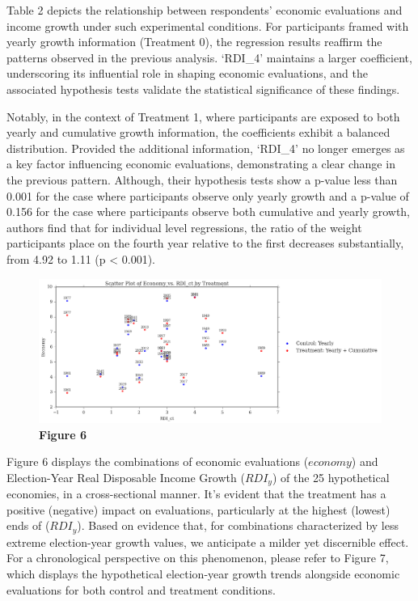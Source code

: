 \documentclass[
]{article}
\begin{document}
Table 2 depicts the relationship between respondents' economic
evaluations and income growth under such experimental conditions. For
participants framed with yearly growth information (Treatment 0), the
regression results reaffirm the patterns observed in the previous
analysis. `RDI\_4' maintains a larger coefficient, underscoring its
influential role in shaping economic evaluations, and the associated
hypothesis tests validate the statistical significance of these
findings.

Notably, in the context of Treatment 1, where participants are exposed
to both yearly and cumulative growth information, the coefficients
exhibit a balanced distribution. Provided the additional information,
`RDI\_4' no longer emerges as a key factor influencing economic
evaluations, demonstrating a clear change in the previous pattern.
Although, their hypothesis tests show a p-value less than 0.001 for the
case where participants observe only yearly growth and a p-value of
0.156 for the case where participants observe both cumulative and yearly
growth, authors find that for individual level regressions, the ratio of
the weight participants place on the fourth year relative to the first
decreases substantially, from 4.92 to 1.11 (p \textless{} 0.001).

\begin{figure}
\centering
\includegraphics{difcuma.png}
\caption{\textbf{Figure 6}}
\end{figure}

Figure 6 displays the combinations of economic evaluations (\(economy\))
and Election-Year Real Disposable Income Growth (\(RDI_y\)) of the 25
hypothetical economies, in a cross-sectional manner. It's evident that
the treatment has a positive (negative) impact on evaluations,
particularly at the highest (lowest) ends of (\(RDI_y\)). Based on
evidence that, for combinations characterized by less extreme
election-year growth values, we anticipate a milder yet discernible
effect. For a chronological perspective on this phenomenon, please refer
to Figure 7, which displays the hypothetical election-year growth trends
alongside economic evaluations for both control and treatment
conditions.
\end{document}
